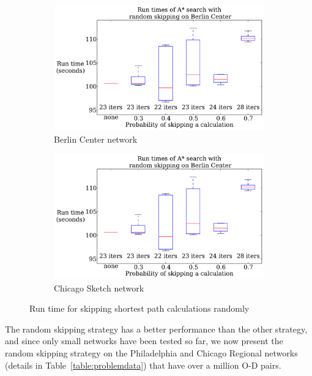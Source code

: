 \begin{figure}[H]
    \centering
    \begin{subfigure}{.5\textwidth}
        \centering
        \includegraphics[page=1,width=\textwidth]{img/random_time}
        \caption{Berlin Center network}
        \label{fig:berlin_random_n}
    \end{subfigure}%
    \begin{subfigure}{.5\textwidth}
        \centering
        \includegraphics[page=2,width=\textwidth]{img/random_time}
        \caption{Chicago Sketch network}
        \label{fig:chicago_random_n}
    \end{subfigure}
    \caption{Run time for skipping shortest path calculations randomly}
    \label{fig:random_n}
\end{figure}

The random skipping strategy has a better performance than the other strategy,
and since only small networks have been tested so far,
we now present the random skipping strategy on the Philadelphia and Chicago Regional networks (details in Table~\ref{table:problemdata}) that have over a million O-D pairs.

